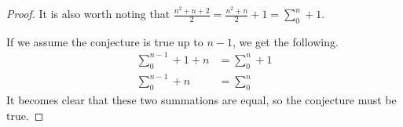 \documentclass[12pt,a4paper,reqno,parskip=full]{amsart}
\numberwithin{equation}{section}
\theoremstyle{plain}
\theoremstyle{definition}
\begin{document}
\begin{enumerate}
\begin{proof}
          It is also worth noting that $\displaystyle\frac{n^2+n+2}{2} = \frac{n^2+n}{2} + 1 = \sum_0^n + 1$.

          If we assume the conjecture is true up to $n-1$, we get the following.
          \begin{align*}
            \sum_0^{n-1} + 1 + n & = \sum_0^n + 1 \\
            \sum_0^{n-1} + n     & = \sum_0^n
          \end{align*}
          It becomes clear that these two summations are equal, so the conjecture must be true.
        \end{proof}
\end{enumerate}
\end{document}
